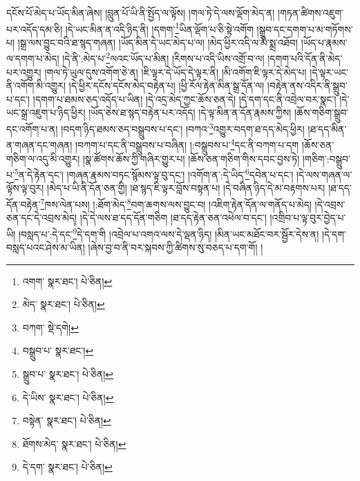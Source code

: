 དངོས་པོ་མེད་པ་ཡོད་མིན་ཞེས། །བླུན་པོ་ཡི་ནི་སྤྱོད་ལ་ལྟོས། །གལ་ཏེ་དེ་ལས་ལྡོག་མེད་ན། །གཏན་ཚིགས་འཇུག་པར་འདོད་དམ་ཅི། །དེ་ཡང་མིན་ན་འདི་ཉིད་ནི། །དགག་\footnote{འགག་  སྣར་ཐང་།  པེ་ཅིན། }ཡིན་ལྡོག་པ་ཅི་སྟེ་འགོག །སྒྲུབ་དང་དགག་པ་མ་གཏོགས་པ། །སྒྲ་ལས་བྱུང་བའི་ཐ་སྙད་གཞན། །ཡོད་མིན་དེ་ཡང་མེད་པ་ལ། །མེད་ཕྱིར་འདི་ལ་མི་སྨྲ་འཐོབ། །ཡོད་པ་རྣམས་ལ་དགག་པ་མེད། །དེ་ནི་:མེད་པ་\footnote{མེད་  སྣར་ཐང་།  པེ་ཅིན། }ལའང་ཡོད་པ་མིན། །རིགས་པ་འདི་ཡིས་འགྲོ་བ་ལ། །དགག་པའི་དོན་ནི་མེད་པར་འགྱུར། །གལ་ཏེ་ཡུལ་དུས་འགོག་ཅེ་ན། །ཇི་ལྟར་དེ་ཡོད་དེ་ལྟར་ནི། །མི་འགོག་ཇི་ལྟར་དེ་མེད་པ། །དེ་ལྟར་ཡང་ནི་འགོག་མི་འགྱུར། །དེ་ཕྱིར་དངོས་དངོས་མེད་བརྟེན་པ། །ཕྱི་རོལ་རྟེན་མིན་སྒྲ་དོན་ལ། །བརྟེན་ནས་འདིར་ནི་སྒྲུབ་པ་དང་། །དགག་པ་ཐམས་ཅད་འདོད་པ་ཡིན། །དེ་འདྲ་མེད་ཀྱང་ཆོས་ཅན་དེ། །དེ་དག་དང་ནི་འབྲེལ་བར་སྣང་། །དེ་ཡང་སྒྲ་འཇུག་པ་ཉིད་ཕྱིར། །ཡོད་ཅེས་ཐ་སྙད་བརྟེན་པར་འདོད། །དེ་ལྟ་མིན་ན་དོན་རྣམས་ཀྱིས། །ཆོས་གཅིག་སྒྲུབ་དང་འགོག་པ་ན། །བདག་ཉིད་ཐམས་ཅད་བསྒྲུབས་པ་དང་། །བཀའ་\footnote{བཀག་  སྡེ་དགེ། }འགྱུར་བདག་ཐ་དད་མེད་ཕྱིར། །ཐ་དད་མིན་ན་གཞན་དང་གཞན། །བཀག་པ་དང་ནི་བསྒྲུབས་པ་བཞིན། །:བསྒྲུབས་པ་\footnote{བསྒྲུབ་པ་  སྣར་ཐང་། }དང་ནི་བཀག་པ་དག །ཆོས་ཅན་གཅིག་ལ་འདུ་མི་འགྱུར། །སྣ་ཚོགས་ཆོས་ཀྱི་གཞིར་གྱུར་པ། །ཆོས་ཅན་གཅིག་གིས་དབང་བྱས་ཏེ། །གཅིག་:བསྒྲུབ་པ་\footnote{སྒྲུབ་པ་  སྣར་ཐང་།  པེ་ཅིན། }ན་དེ་རྟེན་དང་། །གཞན་རྣམས་བཏང་སྙོམས་ལྟ་བུ་དང་། །འགོག་ན་:དེ་ཡིད་\footnote{དེ་ཡིས་  སྣར་ཐང་།  པེ་ཅིན། }དབེན་པ་དང་། །དེ་ལས་གཞན་ལ་ལྟོས་ལྟ་བུར། །མེད་པ་ཡི་ནི་དོན་ཅན་གྱི། །ཐ་སྙད་ཇི་ལྟར་བློས་བསྟན་པ། །དེ་བཞིན་ཉིད་དེ་མ་བརྟགས་པར། །ཐ་དད་དོན་བརྟེན་\footnote{བསྟེན་  སྣར་ཐང་།  པེ་ཅིན། }ཁས་ལེན་པས། །:ཐོག་མེད་\footnote{ཐོགས་མེད་  སྣར་ཐང་།  པེ་ཅིན། }བག་ཆགས་ལས་བྱུང་བ། །འཇིག་རྟེན་དོན་ལ་གནོད་པ་མེད། །དེ་འབྲས་ཅན་དང་དེ་འབྲས་མེད། །དེ་དེ་ལས་ཐ་དད་དོན་གཅིག །ཐ་དད་རྟེན་ཅན་འཕེལ་བ་དང་། །འགྲིབ་པ་ལྟ་བུར་བྱེད་པ་ཡི། །བསླད་པ་:དེ་དང་\footnote{དེ་དག་  སྣར་ཐང་།  པེ་ཅིན། }དེ་དག་གི །འབྲེལ་པ་འགའ་ལས་དེ་ལྡན་ཉིད། །མིན་ཡང་མཐོང་བར་སྦྱོར་དེས་ན། །དེ་དག་བསླད་པའང་ཤེས་མ་ཡིན། །ཞེས་བྱ་བ་ནི་བར་སྐབས་ཀྱི་ཚིགས་སུ་བཅད་པ་དག་གོ། །
